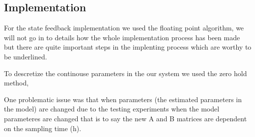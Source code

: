 \documentclass[a4paper]{article}
\begin{document}
\subsection{Implementation}



For the state feedback implementation we used  the floating point algorithm, we will not go in to details how the whole implementation process has been made but there are quite important steps in the implenting process which are worthy to be underlined.

To descretize the continouse parameters in the our system we used the zero hold method, 

One problematic issue was that when parameters (the estimated parameters in the model) are changed due to the testing experiments when the model parameteres are changed that is to say the new A and B matrices are dependent on the sampling time (h).
\end{document}
